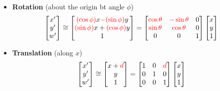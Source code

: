 \begin{itemize}
    \item \textbf{Rotation} (about the origin bt angle $\phi$) \[
        \begin{bmatrix}
            x' \\ y' \\ w'
        \end{bmatrix} \cong \begin{bmatrix}
            {\color{red}(\cos \phi)} x {\color{red}- (\sin \phi)} y \\
            {\color{red}(\sin \phi)} x + {\color{red}(\cos \phi)} y \\
            1
        \end{bmatrix} = \begin{bmatrix}
            {\color{red}\cos \theta} & {\color{red}-\sin \theta} & 0 \\
            {\color{red}\sin \theta} & {\color{red}\cos \theta} & 0 \\
            0 & 0 & 1
        \end{bmatrix} \begin{bmatrix}
            x \\ y \\ 1
        \end{bmatrix}
    \]

    \item \textbf{Translation} (along $x$) \[
        \begin{bmatrix}
            x' \\ y' \\ w'
        \end{bmatrix} \cong \begin{bmatrix}
            x + {\color{red} d} \\ y \\ 1
        \end{bmatrix} = \begin{bmatrix}
            1 & 0 & {\color{red} d} \\
            0 & 1 & 0 \\
            0 & 0 & 1
        \end{bmatrix} \begin{bmatrix}
            x \\ y \\ 1
        \end{bmatrix}
    \]


\end{itemize}
